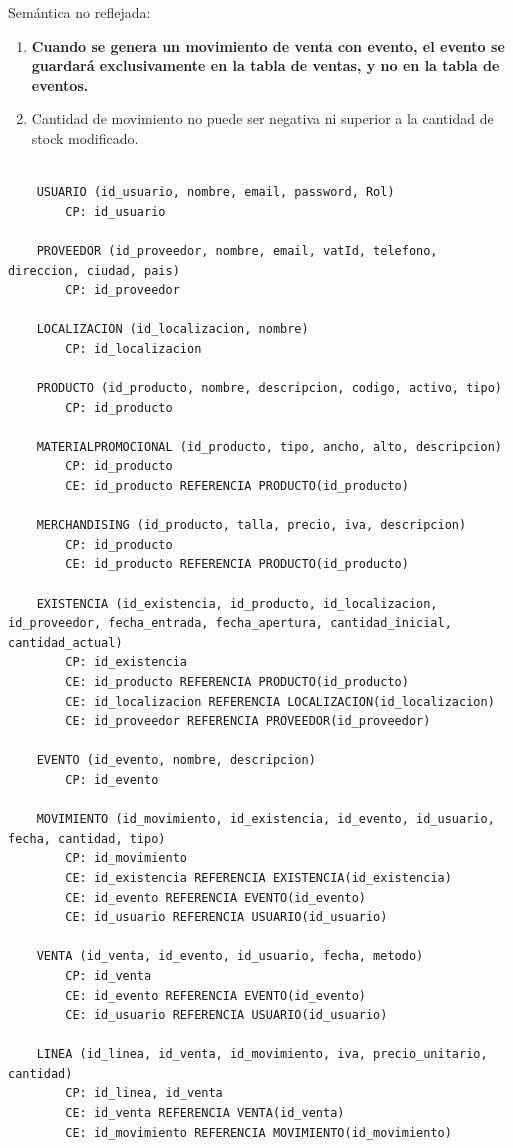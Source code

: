 Semántica no reflejada:
\begin{enumerate}
    \item \textbf{Cuando se genera un movimiento de venta con evento, el evento se guardará exclusivamente en la tabla de ventas, y no en la tabla de eventos.}
    \item Cantidad de movimiento no puede ser negativa ni superior a la cantidad de stock modificado.
\end{enumerate}

\begin{lstlisting}[caption={Modelo Relacional - Papertory}, label={fig:modelo-relacional-papertory}]

    USUARIO (id_usuario, nombre, email, password, Rol)
        CP: id_usuario

    PROVEEDOR (id_proveedor, nombre, email, vatId, telefono, direccion, ciudad, pais)
        CP: id_proveedor

    LOCALIZACION (id_localizacion, nombre)
        CP: id_localizacion

    PRODUCTO (id_producto, nombre, descripcion, codigo, activo, tipo)
        CP: id_producto

    MATERIALPROMOCIONAL (id_producto, tipo, ancho, alto, descripcion)
        CP: id_producto
        CE: id_producto REFERENCIA PRODUCTO(id_producto)

    MERCHANDISING (id_producto, talla, precio, iva, descripcion)
        CP: id_producto
        CE: id_producto REFERENCIA PRODUCTO(id_producto)

    EXISTENCIA (id_existencia, id_producto, id_localizacion, id_proveedor, fecha_entrada, fecha_apertura, cantidad_inicial, cantidad_actual)
        CP: id_existencia
        CE: id_producto REFERENCIA PRODUCTO(id_producto)
        CE: id_localizacion REFERENCIA LOCALIZACION(id_localizacion)
        CE: id_proveedor REFERENCIA PROVEEDOR(id_proveedor)

    EVENTO (id_evento, nombre, descripcion)
        CP: id_evento

    MOVIMIENTO (id_movimiento, id_existencia, id_evento, id_usuario, fecha, cantidad, tipo)
        CP: id_movimiento
        CE: id_existencia REFERENCIA EXISTENCIA(id_existencia)
        CE: id_evento REFERENCIA EVENTO(id_evento)
        CE: id_usuario REFERENCIA USUARIO(id_usuario)

    VENTA (id_venta, id_evento, id_usuario, fecha, metodo)
        CP: id_venta
        CE: id_evento REFERENCIA EVENTO(id_evento)
        CE: id_usuario REFERENCIA USUARIO(id_usuario)

    LINEA (id_linea, id_venta, id_movimiento, iva, precio_unitario, cantidad)
        CP: id_linea, id_venta
        CE: id_venta REFERENCIA VENTA(id_venta)
        CE: id_movimiento REFERENCIA MOVIMIENTO(id_movimiento)



    
\end{lstlisting}


